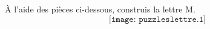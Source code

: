 \par \`A l'aide des pièces ci-dessous, construis la lettre M.
\[\texttt{[image: puzzleslettre.1]}\]
